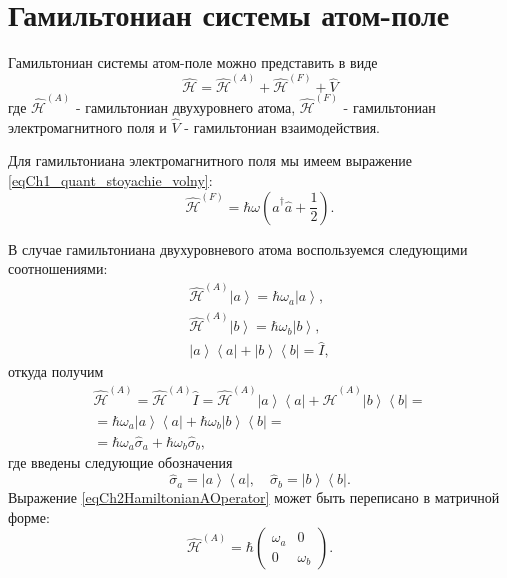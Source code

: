 \section{Гамильтониан системы атом-поле}
Гамильтониан системы атом-поле можно представить в виде
\begin{equation}
\hat{\mathcal{H}} = \hat{\mathcal{H}}^{(A)} +
\hat{\mathcal{H}}^{(F)} + \hat{V}
\nonumber
\end{equation}
где
$\hat{\mathcal{H}}^{(A)}$ - гамильтониан двухуровнего атома,
$\hat{\mathcal{H}}^{(F)}$ - гамильтониан электромагнитного поля и
$\hat{V}$ - гамильтониан взаимодействия.

Для гамильтониана электромагнитного поля мы имеем выражение
\eqref{eqCh1_quant_stoyachie_volny}:
\begin{equation}
\hat{\mathcal{H}}^{(F)} = \hbar \omega 
\left(\hat{a}^{\dag}\hat{a} + \frac{1}{2}\right).
\nonumber
\end{equation}

В случае гамильтониана двухуровневого атома воспользуемся следующими
соотношениями:
\begin{eqnarray}
\hat{\mathcal{H}}^{(A)}\left|a\right> = \hbar \omega_a \left|a\right>,
\nonumber \\
\hat{\mathcal{H}}^{(A)}\left|b\right> = \hbar \omega_b \left|b\right>,
\nonumber \\
\left|a\right>\left<a\right| + \left|b\right>\left<b\right| = \hat{I},
\nonumber
\end{eqnarray}
откуда получим
\begin{eqnarray}
\hat{\mathcal{H}}^{(A)} = \hat{\mathcal{H}}^{(A)}\hat{I} = 
\hat{\mathcal{H}}^{(A)}
\left|a\right>\left<a\right| + \hat{\mathcal{H}}^{(A)}
\left|b\right>\left<b\right| =
\nonumber \\
 = 
\hbar\omega_a
\left|a\right>\left<a\right| + \hbar\omega_b
\left|b\right>\left<b\right| =
\nonumber \\
= \hbar \omega_a \hat{\sigma}_a +
\hbar \omega_b \hat{\sigma}_b,
\label{eqCh2HamiltonianAOperator}
\end{eqnarray}
где введены следующие обозначения
\begin{equation}
\hat{\sigma}_a = \left|a\right>\left<a\right|,
\quad
\hat{\sigma}_b = \left|b\right>\left<b\right|.
\nonumber
\end{equation}
Выражение \eqref{eqCh2HamiltonianAOperator} может быть переписано в
матричной форме:
\begin{equation}
\hat{\mathcal{H}}^{(A)} = \hbar 
\left(
\begin{array} {cc}
\omega_a & 0  
\\
0 & \omega_b 
\end{array}
\right).
\label{eqCh2HamiltonianA}
\end{equation}

